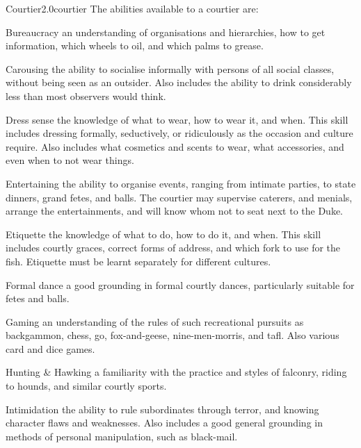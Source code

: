 \begin{skill}{Courtier}{2.0}{courtier}
The abilities available to a courtier are:

\begin{Description}

\item[Bureaucracy] an understanding of organisations and hierarchies,
how to get information, which wheels to oil, and which palms to
grease.

\item[Carousing] the ability to socialise informally with persons of
all social classes, without being seen as an outsider. Also includes
the ability to drink considerably less than most observers would
think.

\item[Dress sense] the knowledge of what to wear, how to wear it, and
when.  This skill includes dressing formally, seductively, or
ridiculously as the occasion and culture require. Also includes what
cosmetics and scents to wear, what accessories, and even when to not
wear things.

\item[Entertaining] the ability to organise events, ranging from
intimate parties, to state dinners, grand fetes, and balls. The
courtier may supervise caterers, and menials, arrange the
entertainments, and will know whom not to seat next to the Duke.

\item[Etiquette] the knowledge of what to do, how to do it, and
when. This skill includes courtly graces, correct forms of address,
and which fork to use for the fish. Etiquette must be learnt
separately for different cultures.

\item[Formal dance] a good grounding in formal courtly dances,
particularly suitable for fetes and balls.

\item[Gaming] an understanding of the rules of such recreational
pursuits as backgammon, chess, go, fox-and-geese, nine-men-morris, and
tafl. Also various card and dice games.

\item[Hunting \& Hawking] a familiarity with the practice and styles of
falconry, riding to hounds, and similar courtly sports.

\item[Intimidation] the ability to rule subordinates through terror,
and knowing character flaws and weaknesses. Also includes a good
general grounding in methods of personal manipulation, such as
black-mail.


\end{Description}
\end{skill}
